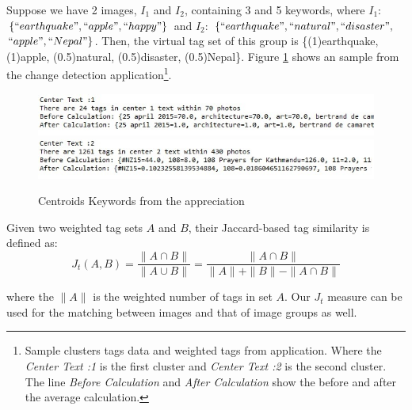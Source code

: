 \documentclass[runningheads,a4paper]{llncs}
\begin{document}
Suppose we have 2 images, $I_1$ and $I_2$, containing 3 and 5 keywords, where $I_1$: $\{``earthquake",``apple",``happy"\}$ and $I_2$: $\{``earthquake",``natural",``disaster",$ $``apple",``Nepal"\}$. Then, the virtual tag set of this group is \{(1)earthquake, (1)apple, (0.5)natural, (0.5)disaster, (0.5)Nepal\}. Figure \ref{fig:centroid} shows an sample from the change detection application{\footnote {Sample clusters tags data and weighted tags from application. Where the \textit{Center Text :1} is the first cluster and \textit{Center Text :2} is the second cluster. The line \textit{Before Calculation} and \textit{After Calculation} show the before and after the average calculation.}}.
\begin{figure}[h]
	\centering\vspace{-8ex}
	\includegraphics[width=50cm,bb=0 0 1820 73]{centroid.jpg}\vspace{-4ex}
	\includegraphics[width=50cm,bb=0 0 1820 73]{centroid2.jpg}\vspace{-4ex}
	\caption{Centroids Keywords from the appreciation}\label{fig:centroid}
\end{figure}

Given two weighted tag sets $A$ and $B$, their Jaccard-based tag similarity is defined as:
\begin{equation}\label{eq:JAAAAC}
 J_t(A,B) = \frac{\|A\cap B\|}{\|A\cup B\|} = \frac{\|A\cap B\|}{\|A\|+\|B\|-\|A\cap B\|}
\end{equation}


\noindent where the $\|A\|$ is the weighted number of tags in set $A$. Our $J_t$ measure can be used for the matching between images and that of image groups as well.
\end{document}
